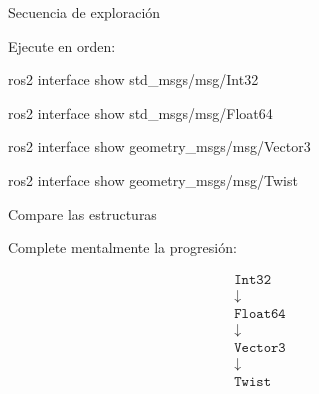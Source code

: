 \documentclass[aspectratio=169]{beamer}
\begin{document}
\begin{frame}[fragile]{Secuencia de exploración}

    Ejecute en orden:

    \begin{bashcodedark}
        ros2 interface show std_msgs/msg/Int32
    \end{bashcodedark}

    \begin{bashcodedark}
        ros2 interface show std_msgs/msg/Float64
    \end{bashcodedark}

    \begin{bashcodedark}
        ros2 interface show geometry_msgs/msg/Vector3
    \end{bashcodedark}

    \begin{bashcodedark}
        ros2 interface show geometry_msgs/msg/Twist
    \end{bashcodedark}

\end{frame}

\begin{frame}{Compare las estructuras}

    Complete mentalmente la progresión:

    \[
    \begin{matrix}
    \boxed{
        \texttt{Int32}
    }
    \\
    \downarrow
    \\
    \boxed{
        \texttt{Float64}
    }
    \\
    \downarrow
    \\
    \boxed{
        \texttt{Vector3}
    }
    \\
    \downarrow
    \\
    \boxed{
        \texttt{Twist}
    }
\end{matrix}
    \]

    \vspace{0.3cm}


\end{frame}
\end{document}
